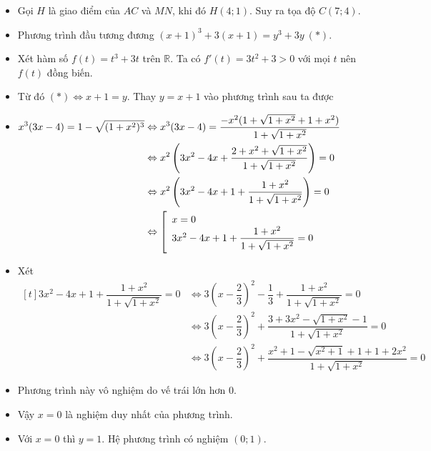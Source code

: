 \begin{itemize}[label=,leftmargin=*]
\item Gọi $H$ là giao điểm của $AC$ và $MN$, khi đó $H(4;1)$. Suy ra tọa độ $C(7;4)$.
\end{itemize}


\lgi 
\begin{itemize}[label=,leftmargin=*]
\item Phương trình đầu tương đương $(x+1)^3+3(x+1)=y^3+3y \ (*)$.
\item Xét hàm số $f(t)=t^3+3t$ trên $\mathbb{R}$. Ta có $f'(t)=3t^2+3>0$ với mọi $t$ nên $f(t)$ đồng biến.
\item Từ đó $(*)\Leftrightarrow x+1=y$. Thay $y=x+1$ vào phương trình sau ta được
\item $\begin{aligned}[t]x^3(3x-4)=1-\sqrt{(1+x^2)^3}&\Leftrightarrow x^3(3x-4)=\dfrac{-x^2(1+\sqrt{1+x^2}+1+x^2)}{1+\sqrt{1+x^2}} \\
&\Leftrightarrow x^2\left(3x^2-4x+\dfrac{2+x^2+\sqrt{1+x^2}}{1+\sqrt{1+x^2}}\right)=0 \\
&\Leftrightarrow x^2\left(3x^2-4x+1 +\dfrac{1+x^2}{1+\sqrt{1+x^2}} \right)=0 \\
&\Leftrightarrow \left[\begin{array}{ll}x=0 \\3x^2-4x+1 +\dfrac{1+x^2}{1+\sqrt{1+x^2}}=0 \end{array}\right.
\end{aligned}$
\item Xét $\begin{aligned}[t] 3x^2-4x+1 +\dfrac{1+x^2}{1+\sqrt{1+x^2}}=0 &\Leftrightarrow 3\left(x-\dfrac{2}{3} \right)^2-\dfrac{1}{3}+\dfrac{1+x^2}{1+\sqrt{1+x^2}}=0\\
&\Leftrightarrow 3\left(x-\dfrac{2}{3} \right)^2+\dfrac{3+3x^2-\sqrt{1+x^2}-1}{1+\sqrt{1+x^2}}=0\\
&\Leftrightarrow 3\left(x-\dfrac{2}{3} \right)^2 +\dfrac{x^2+1-\sqrt{x^2+1}+1+1+2x^2 }{1+\sqrt{1+x^2}}=0\end{aligned}$
\item Phương trình này vô nghiệm do vế trái lớn hơn 0.
\item Vậy $x=0$ là nghiệm duy nhất của phương trình.
\item Với $x=0$ thì $y=1$. Hệ phương trình có nghiệm $(0;1)$.
\end{itemize}

